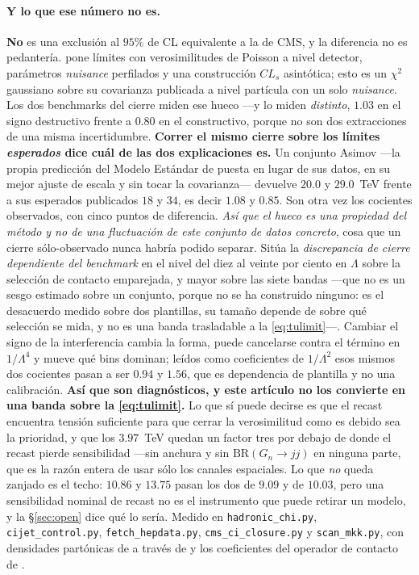 \documentclass[11pt,a4paper]{article}
\begin{document}
\paragraph{Y lo que ese número no es.} \textbf{No} es una exclusión al $95\%$ de CL equivalente a
la de CMS, y la diferencia no es pedantería. \cite{CMSangular} pone límites con verosimilitudes
de Poisson a nivel detector, parámetros \emph{nuisance} perfilados y una construcción $CL_s$
asintótica; esto es un $\chi^2$ gaussiano sobre su covarianza publicada a nivel partícula con un
solo \emph{nuisance}. Los dos benchmarks del cierre miden ese hueco ---y lo miden \emph{distinto}, $1.03$
en el signo destructivo frente a $0.80$ en el constructivo, porque no son dos extracciones de una
misma incertidumbre. \textbf{Correr el mismo cierre sobre los límites \emph{esperados} dice cuál
de las dos explicaciones es.} Un conjunto Asimov ---la propia predicción del Modelo Estándar de
\cite{CMSangular} puesta en lugar de sus datos, en su mejor ajuste de escala y sin tocar la
covarianza--- devuelve $20.0$ y $29.0$~TeV frente a sus esperados publicados $18$ y $34$, es decir
$1.08$ y $0.85$. Son otra vez los cocientes observados, con cinco puntos de diferencia. \emph{Así
que el hueco es una propiedad del método y no de una fluctuación de este conjunto de datos
concreto}, cosa que un cierre sólo-observado nunca habría podido separar. Sitúa la
\emph{discrepancia de cierre dependiente del benchmark} en el nivel del diez al veinte por ciento
en $\Lambda$ sobre la selección de contacto emparejada, y mayor sobre las siete bandas
---que no es un sesgo estimado sobre un conjunto, porque no se ha construido ninguno: es el
desacuerdo medido sobre dos plantillas, su tamaño depende de sobre qué selección se mida, y no es
una banda trasladable a la
\eqref{eq:tulimit}---. Cambiar el signo de la interferencia cambia la forma, puede cancelarse
contra el término en $1/\Lambda^4$ y mueve qué bins dominan; leídos como coeficientes de
$1/\Lambda^2$ esos mismos dos cocientes pasan a ser $0.94$ y $1.56$, que es dependencia de
plantilla y no una calibración. \textbf{Así que son diagnósticos, y este artículo no los convierte en
una banda sobre la \eqref{eq:tulimit}.} Lo que sí puede decirse es que el recast encuentra
tensión suficiente para que cerrar la verosimilitud como es debido sea la prioridad, y que los
$3.97$~TeV quedan un factor tres por debajo de donde el recast pierde sensibilidad ---sin anchura
y sin $\mathrm{BR}(G_n\to jj)$ en ninguna parte, que es la razón entera de usar sólo los canales
espaciales. Lo que \emph{no} queda zanjado es el techo: $10.86$ y $13.75$ pasan los dos de $9.09$ y
de $10.03$, pero una sensibilidad nominal de recast no es el instrumento que puede retirar un
modelo, y la \S\ref{sec:open} dice qué lo sería. Medido
en \texttt{hadronic\_\allowbreak chi.py}, \texttt{cijet\_\allowbreak control.py},
\texttt{fetch\_\allowbreak hepdata.py}, \texttt{cms\_\allowbreak ci\_\allowbreak closure.py} y
\texttt{scan\_\allowbreak mkk.py}, con densidades partónicas de \cite{CT10} a través de
\cite{LHAPDF} y los coeficientes del operador de contacto de \cite{CIJET}.
\end{document}
